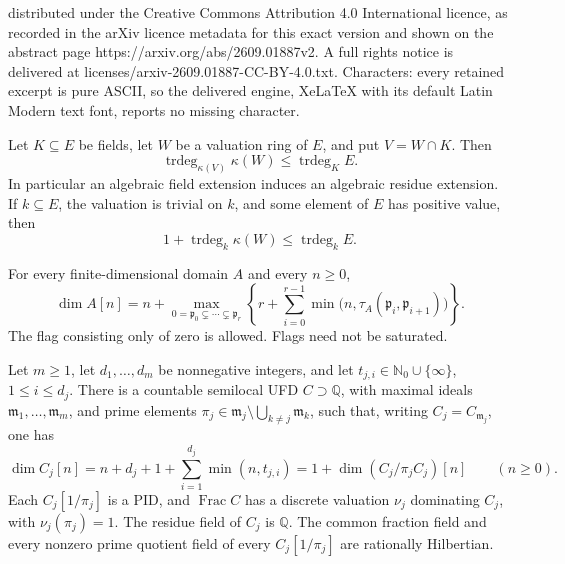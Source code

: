 \documentclass[10pt,a4paper]{amsart}
\begin{document}
distributed under the Creative Commons Attribution 4.0 International licence, as recorded in the arXiv licence metadata for this exact version and shown on the abstract page https://arxiv.org/abs/2609.01887v2. A full rights notice is delivered at licenses/arxiv-2609.01887-CC-BY-4.0.txt. Characters: every retained excerpt is pure ASCII, so the delivered engine, XeLaTeX with its default Latin Modern text font, reports no missing character.
\begin{lemma}\label{lem:residue-extension}
Let \(K\subseteq E\) be fields, let \(W\) be a valuation ring of
\(E\), and put \(V=W\cap K\). Then
\begin{equation}\label{eq:residue-extension}
 \operatorname{trdeg}_{\kappa(V)}\kappa(W)
       \leq\operatorname{trdeg}_K E.
\end{equation}
In particular an algebraic field extension induces an algebraic residue
extension. If \(k\subseteq E\), the valuation is trivial on \(k\),
and some element of \(E\) has positive value, then
\begin{equation}\label{eq:positive-value-bound}
 1+\operatorname{trdeg}_k\kappa(W)
       \leq\operatorname{trdeg}_k E.
\end{equation}
\end{lemma}

\begin{theorem}\label{thm:capacity}
For every finite-dimensional domain \(A\) and every \(n\geq0\),
\begin{equation}\label{eq:capacity-formula}
 \dim A[n]=n+\max_{0=\mathfrak p_0\subsetneq\cdots\subsetneq\mathfrak p_r}
 \left\{r+\sum_{i=0}^{r-1}
        \min\bigl(n,\tau_A(\mathfrak p_i,\mathfrak p_{i+1})\bigr)\right\}.
\end{equation}
The flag consisting only of zero is allowed. Flags need not be saturated.
\end{theorem}

\begin{theorem}\label{thm:ordinary}
Let \(m\ge1\), let \(d_1,\ldots,d_m\) be nonnegative integers, and let
\(t_{j,i}\in\mathbb N_0\cup\{\infty\}\), \(1\le i\le d_j\).
There is a countable semilocal UFD \(C\supset\mathbb Q\), with maximal
ideals \(\mathfrak m_1,\ldots,\mathfrak m_m\), and prime elements
\(\pi_j\in\mathfrak m_j\setminus\bigcup_{k\ne j}\mathfrak m_k\), such that,
writing \(C_j=C_{\mathfrak m_j}\), one has
\begin{equation}\label{eq:ordinary-realization}
 \dim C_j[n]=n+d_j+1+\sum_{i=1}^{d_j}\min(n,t_{j,i})
            =1+\dim(C_j/\pi_jC_j)[n]\qquad(n\ge0).
\end{equation}
Each \(C_j[1/\pi_j]\) is a PID, and \(\operatorname{Frac}C\) has a
discrete valuation \(\nu_j\) dominating \(C_j\), with
\(\nu_j(\pi_j)=1\). The residue field of \(C_j\) is \(\mathbb Q\).
The common fraction field and every nonzero prime quotient field of
every \(C_j[1/\pi_j]\) are rationally Hilbertian.
\end{theorem}
\end{document}
